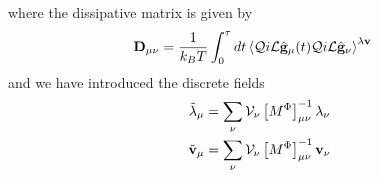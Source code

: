 \documentclass[b5paper,openright,11pt]{book}
\newcommand{\llangle}{\left\langle}
\newcommand{\rrangle}{\right\rangle}
\begin{document}
where the dissipative matrix is given by
\begin{align}
{\bf D}_{\mu\nu}&=  \frac{1}{k_BT}
\int_0^\tau dt \llangle {\cal Q}i{\cal L}\hat{\bf g}_\mu(t){\cal Q}i{\cal L}\hat{\bf g}_\nu\rrangle^{\lambda{\bf v}} 
\label{Dmunu}
\end{align}
and we have introduced the discrete fields
\begin{align}
\tilde{\lambda}_\mu&=\sum_\nu{\cal V}_{\nu}\left[M^\Phi\right]^{-1}_{\mu\nu}\lambda_{\nu}
\nonumber\\
\tilde{\bf v}_\mu&=\sum_\nu{\cal V}_{\nu}\left[M^\Phi\right]^{-1}_{\mu\nu}{\bf v}_{\nu}
\label{overlined}
\end{align}
\end{document}
